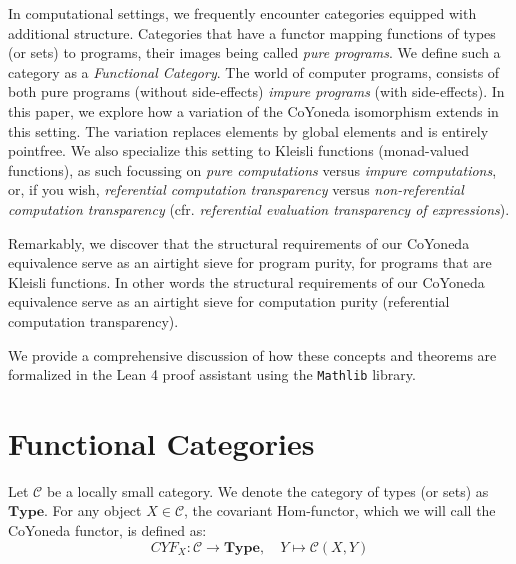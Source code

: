 \documentclass{article}
\begin{document}
In computational settings, we frequently encounter categories equipped with additional structure.
Categories that have a functor mapping functions of types (or sets) to programs, their images being
called \emph{pure programs}. We define such a category as a \emph{Functional Category}. The world of
computer programs, consists of both pure programs (without side-effects) \emph{impure programs}
(with side-effects). In this paper, we explore how a variation of the CoYoneda isomorphism extends
in this setting. The variation replaces elements by global elements and is entirely pointfree. We
also specialize this setting to Kleisli functions (monad-valued functions), as such focussing on
\emph{pure computations} versus \emph{impure computations}, or, if you wish,
\emph{referential computation transparency} versus
\emph{non-referential computation transparency}
(cfr. \emph{referential evaluation transparency of expressions}).

Remarkably, we discover that the structural requirements of our Co\!Yoneda equivalence serve as an
airtight sieve for program purity, for programs that are Kleisli functions. In other words the
structural requirements of our Co\!Yoneda equivalence serve as an airtight sieve for computation
purity (referential computation transparency).

We provide a comprehensive discussion of how these concepts and theorems are formalized in the
Lean 4 proof assistant using the \texttt{Mathlib} library.

\section{Functional Categories}

Let $\mathcal{C}$ be a locally small category. We denote the category of types (or sets) as
$\mathbf{Type}$. For any object $X \in \mathcal{C}$, the covariant Hom-functor, which we will call
the CoYoneda functor, is defined as:
\[
CY\!F_X : \mathcal{C} \to \mathbf{Type}, \quad Y \mapsto \mathcal{C}(X, Y)
\]
\end{document}
